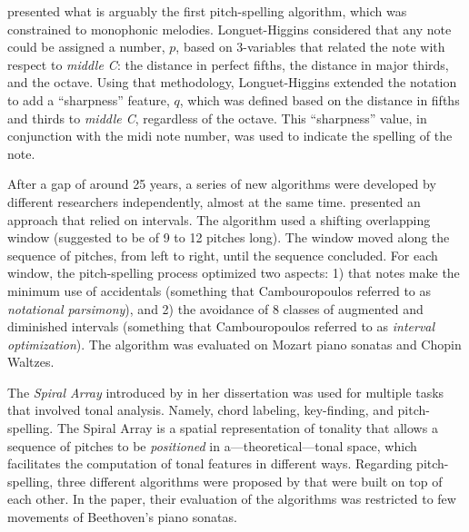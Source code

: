 

\textcite{longuethiggins1976perception} presented what is
arguably the first pitch-spelling algorithm, which was
constrained to monophonic melodies. Longuet-Higgins
considered that any note could be assigned a number, $p$,
based on 3-variables that related the note with respect to
\emph{middle C}: the distance in perfect fifths, the
distance in major thirds, and the octave. Using that
methodology, Longuet-Higgins extended the notation to add a
``sharpness'' feature, $q$, which was defined based on the
distance in fifths and thirds to \emph{middle C}, regardless
of the octave. This ``sharpness'' value, in conjunction with
the \gls{midi} note number, was used to indicate the
spelling of the note.

After a gap of around 25 years, a series of new algorithms
were developed by different researchers independently,
almost at the same time. \textcite{cambouropoulos2003pitch}
presented an approach that relied on intervals. The
algorithm used a shifting overlapping window (suggested to
be of 9 to 12 pitches long). The window moved along the
sequence of pitches, from left to right, until the sequence
concluded. For each window, the pitch-spelling process
optimized two aspects: 1) that notes make the minimum use of
accidentals (something that Cambouropoulos referred to as
\emph{notational parsimony}), and 2) the avoidance of 8
classes of augmented and diminished intervals (something
that Cambouropoulos referred to as \emph{interval
optimization}). The algorithm was evaluated on Mozart piano
sonatas and Chopin Waltzes.

The \emph{Spiral Array} introduced by
\textcite{chew2000towards} in her dissertation was used for
multiple tasks that involved tonal analysis. Namely, chord
labeling, key-finding, and pitch-spelling. The Spiral Array
is a spatial representation of tonality that allows a
sequence of pitches to be \emph{positioned} in
a---theoretical---tonal space, which facilitates the
computation of tonal features in different ways. Regarding
pitch-spelling, three different algorithms were proposed by
\textcite{chew2003determining} that were built on top of
each other. In the paper, their evaluation of the algorithms
was restricted to few movements of Beethoven's piano
sonatas.

